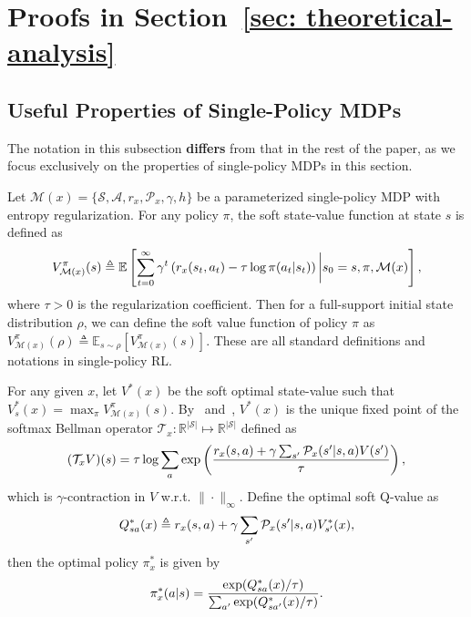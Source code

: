 \documentclass{article}
\theoremstyle{plain}
\theoremstyle{definition}
\theoremstyle{remark}
\def\E{\mathbb E}
\def\R{\mathbb R}
\def\cA{\mathcal A}
\def\cM{\mathcal M}
\def\cP{\mathcal P}
\def\cS{\mathcal S}
\def\cT{\mathcal T}
\def\bydef{\triangleq}
\begin{document}

\section{Proofs in Section~\ref{sec: theoretical-analysis}} 
\subsection{Useful Properties of Single-Policy MDPs}
The notation in this subsection \textbf{differs} from that in the rest of the paper, as we focus exclusively on the properties of single-policy MDPs in this section.

Let $\cM(x)=\{\cS,\cA,r_x,\cP_x,\gamma,h\}$ be a parameterized
single-policy MDP with entropy regularization. For any policy $\pi$, the
soft state-value function at state $s$ is defined as
\begin{align}
    V^{\pi}_{\cM(x)}(s) \bydef \E \left[ \sum_{t=0}^{\infty} \gamma^t \left(r_x(s_t,a_t) - \tau \log \pi(a_t|s_t) \right) \bigg| s_0 = s, \pi, \cM(x)\right], \notag
\end{align}
where $\tau>0$ is the regularization coefficient. Then for a full-support initial state distribution $\rho$, we can define the soft value function of policy $\pi$ as $V^{\pi}_{\cM(x)}(\rho) \bydef \E_{s \sim \rho} [V^{\pi}_{\cM(x)}(s)]$.
These are all standard definitions and notations in single-policy RL. 


For any given $x$, let $V^*(x)$  be the soft optimal state-value such that $V^*_s(x) = \max_{\pi} V^\pi_{\cM(x)}(s)$. By~\citet{nachum2017bridging} and~\citet{yang2025bilevel}, $V^*(x)$ is the unique fixed point of the softmax Bellman operator $\cT_x: \R^{|\cS|} \mapsto \R^{|\cS|}$ defined as
\begin{align}
    (\cT_x V)(s) = \tau \log \sum_{a} \exp\left(\frac{r_x(s,a) + \gamma \sum_{s^\prime} \cP_x(s^\prime|s,a) V(s^\prime)}{\tau} \right), \notag
\end{align}
which is $\gamma$-contraction in $V$ w.r.t. $\| \cdot\|_\infty$.
Define the optimal soft Q-value as
\begin{align}
     Q^*_{sa}(x) \bydef r_x(s,a) + \gamma \sum_{s^\prime}
\cP_x(s^\prime|s,a) V^*_{s^\prime}(x), \notag
\end{align}
then the optimal policy $\pi^*_x$ is given by
\begin{align}
    \pi^*_x(a|s) =  \frac{\exp (Q^*_{sa}(x)/\tau)}{\sum_{a'} \exp (Q^*_{sa'}(x)/\tau)}. \notag
\end{align}
\end{document}
